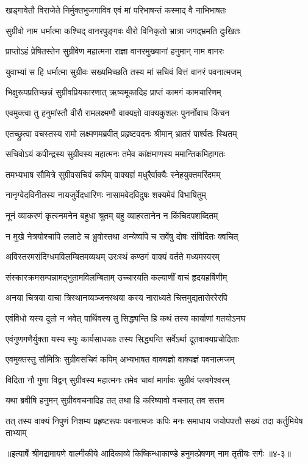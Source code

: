 \twolineshloka
{खड्गावेतौ विराजेते निर्मुक्तभुजगाविव}
{एवं मां परिभाषन्तं कस्माद् वै नाभिभाषतः} %

\twolineshloka
{सुग्रीवो नाम धर्मात्मा कश्चिद् वानरपुङ्गवः}
{वीरो विनिकृतो भ्रात्रा जगद्भ्रमति दुःखितः} %

\twolineshloka
{प्राप्तोऽहं प्रेषितस्तेन सुग्रीवेण महात्मना}
{राज्ञा वानरमुख्यानां हनुमान् नाम वानरः} %

\twolineshloka
{युवाभ्यां स हि धर्मात्मा सुग्रीवः सख्यमिच्छति}
{तस्य मां सचिवं वित्तं वानरं पवनात्मजम्} %

\twolineshloka
{भिक्षुरूपप्रतिच्छन्नं सुग्रीवप्रियकारणात्}
{ऋष्यमूकादिह प्राप्तं कामगं कामचारिणम्} %

\twolineshloka
{एवमुक्त्वा तु हनुमांस्तौ वीरौ रामलक्ष्मणौ}
{वाक्यज्ञो वाक्यकुशलः पुनर्नोवाच किंचन} %

\twolineshloka
{एतच्छ्रुत्वा वचस्तस्य रामो लक्ष्मणमब्रवीत्}
{प्रहृष्टवदनः श्रीमान् भ्रातरं पार्श्वतः स्थितम्} %

\twolineshloka
{सचिवोऽयं कपीन्द्रस्य सुग्रीवस्य महात्मनः}
{तमेव कांक्षमाणस्य ममान्तिकमिहागतः} %

\twolineshloka
{तमभ्यभाष सौमित्रे सुग्रीवसचिवं कपिम्}
{वाक्यज्ञं मधुरैर्वाक्यैः स्नेहयुक्तमरिंदमम्} %

\twolineshloka
{नानृग्वेदविनीतस्य नायजुर्वेदधारिणः}
{नासामवेदविदुषः शक्यमेवं विभाषितुम्} %

\twolineshloka
{नूनं व्याकरणं कृत्स्नमनेन बहुधा श्रुतम्}
{बहु व्याहरतानेन न किंचिदपशब्दितम्} %

\twolineshloka
{न मुखे नेत्रयोश्चापि ललाटे च भ्रुवोस्तथा}
{अन्येष्वपि च सर्वेषु दोषः संविदितः क्वचित्} %

\twolineshloka
{अविस्तरमसंदिग्धमविलम्बितमव्यथम्}
{उरःस्थं कण्ठगं वाक्यं वर्तते मध्यमस्वरम्} %

\twolineshloka
{संस्कारक्रमसम्पन्नामद्भुतामविलम्बिताम्}
{उच्चारयति कल्याणीं वाचं हृदयहर्षिणीम्} %

\twolineshloka
{अनया चित्रया वाचा त्रिस्थानव्यञ्जनस्थया}
{कस्य नाराध्यते चित्तमुद्यतासेररेरपि} %

\twolineshloka
{एवंविधो यस्य दूतो न भवेत् पार्थिवस्य तु}
{सिद्ध्यन्ति हि कथं तस्य कार्याणां गतयोऽनघ} %

\twolineshloka
{एवंगुणगणैर्युक्ता यस्य स्युः कार्यसाधकाः}
{तस्य सिद्ध्यन्ति सर्वेऽर्था दूतवाक्यप्रचोदिताः} %

\twolineshloka
{एवमुक्तस्तु सौमित्रिः सुग्रीवसचिवं कपिम्}
{अभ्यभाषत वाक्यज्ञो वाक्यज्ञं पवनात्मजम्} %

\twolineshloka
{विदिता नौ गुणा विद्वन् सुग्रीवस्य महात्मनः}
{तमेव चावां मार्गावः सुग्रीवं प्लवगेश्वरम्} %

\twolineshloka
{यथा ब्रवीषि हनुमन् सुग्रीववचनादिह}
{तत् तथा हि करिष्यावो वचनात् तव सत्तम} %

\twolineshloka
{तत् तस्य वाक्यं निपुणं निशम्य प्रहृष्टरूपः पवनात्मजः कपिः}
{मनः समाधाय जयोपपत्तौ सख्यं तदा कर्तुमियेष ताभ्याम्} %


॥इत्यार्षे श्रीमद्रामायणे वाल्मीकीये आदिकाव्ये किष्किन्धाकाण्डे हनुमत्प्रेषणम् नाम तृतीयः सर्गः ॥४-३॥

